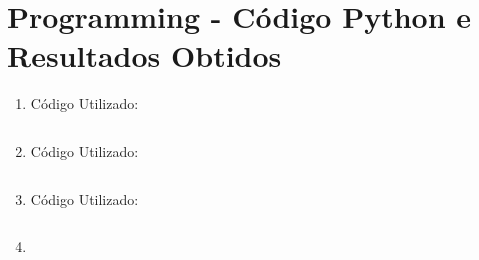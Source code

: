 \documentclass[a4paper,12pt]{article} %
\begin{document}
\clearpage

\section*{Programming - Código Python e Resultados Obtidos}

\begin{enumerate}

\item 
Código Utilizado:

\begin{lstlisting}[language=Python]

\end{lstlisting}

\item 

Código Utilizado:

\begin{lstlisting}[language=Python]

\end{lstlisting}

\item

Código Utilizado:

\begin{lstlisting}[language=Python]

\end{lstlisting}

\item 
\end{enumerate}
\end{document}
